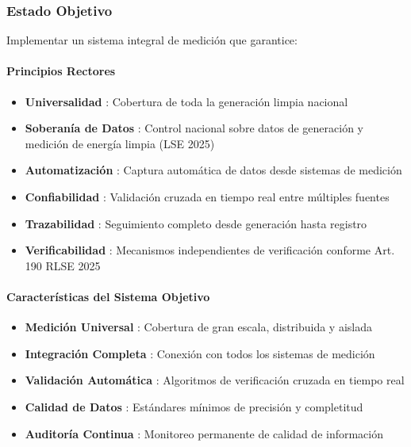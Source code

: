 \documentclass{cel}
\begin{document}
\subsubsection{Estado Objetivo}
\nopagebreak

Implementar un sistema integral de medición que garantice:


\paragraph{Principios Rectores}
\nopagebreak

\begin{itemize}
\item \textbf{Universalidad} : Cobertura de toda la generación limpia nacional
\item \textbf{Soberanía de Datos} : Control nacional sobre datos de generación y medición de energía limpia (LSE 2025)
\item \textbf{Automatización} : Captura automática de datos desde sistemas de medición
\item \textbf{Confiabilidad} : Validación cruzada en tiempo real entre múltiples fuentes
\item \textbf{Trazabilidad} : Seguimiento completo desde generación hasta registro
\item \textbf{Verificabilidad} : Mecanismos independientes de verificación conforme Art. 190 RLSE 2025

\end{itemize}
\paragraph{Características del Sistema Objetivo}
\nopagebreak

\begin{itemize}
\item \textbf{Medición Universal} : Cobertura de gran escala, distribuida y aislada
\item \textbf{Integración Completa} : Conexión con todos los sistemas de medición
\item \textbf{Validación Automática} : Algoritmos de verificación cruzada en tiempo real
\item \textbf{Calidad de Datos} : Estándares mínimos de precisión y completitud
\item \textbf{Auditoría Continua} : Monitoreo permanente de calidad de información

\end{itemize}
\vspace{0.4cm}
\end{document}
